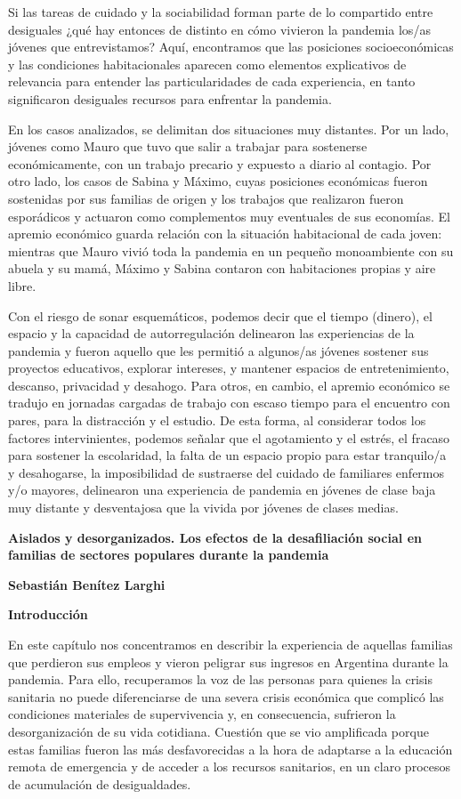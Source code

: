 Si las tareas de cuidado y la sociabilidad forman parte de lo compartido entre desiguales ¿qué hay entonces de distinto en cómo vivieron la pandemia los/as jóvenes que entrevistamos? Aquí, encontramos que las posiciones socioeconómicas y las condiciones habitacionales aparecen como elementos explicativos de relevancia para entender las particularidades de cada experiencia, en tanto significaron desiguales recursos para enfrentar la pandemia.

En los casos analizados, se delimitan dos situaciones muy distantes. Por un lado, jóvenes como Mauro que tuvo que salir a trabajar para sostenerse económicamente, con un trabajo precario y expuesto a diario al contagio. Por otro lado, los casos de Sabina y Máximo, cuyas posiciones económicas fueron sostenidas por sus familias de origen y los trabajos que realizaron fueron esporádicos y actuaron como complementos muy eventuales de sus economías. El apremio económico guarda relación con la situación habitacional de cada joven: mientras que Mauro vivió toda la pandemia en un pequeño monoambiente con su abuela y su mamá, Máximo y Sabina contaron con habitaciones propias y aire libre.

Con el riesgo de sonar esquemáticos, podemos decir que el tiempo (dinero), el espacio y la capacidad de autorregulación delinearon las experiencias de la pandemia y fueron aquello que les permitió a algunos/as jóvenes sostener sus proyectos educativos, explorar intereses, y mantener espacios de entretenimiento, descanso, privacidad y desahogo. Para otros, en cambio, el apremio económico se tradujo en jornadas cargadas de trabajo con escaso tiempo para el encuentro con pares, para la distracción y el estudio. De esta forma, al considerar todos los factores intervinientes, podemos señalar que el agotamiento y el estrés, el fracaso para sostener la escolaridad, la falta de un espacio propio para estar tranquilo/a y desahogarse, la imposibilidad de sustraerse del cuidado de familiares enfermos y/o mayores, delinearon una experiencia de pandemia en jóvenes de clase baja muy distante y desventajosa que la vivida por jóvenes de clases medias.

\textbf{Aislados y desorganizados. Los efectos de la desafiliación social en familias de sectores populares durante la pandemia}

\textbf{Sebastián Benítez Larghi}

\textbf{Introducción}

En este capítulo nos concentramos en describir la experiencia de aquellas familias que perdieron sus empleos y vieron peligrar sus ingresos en Argentina durante la pandemia. Para ello, recuperamos la voz de las personas para quienes la crisis sanitaria no puede diferenciarse de una severa crisis económica que complicó las condiciones materiales de supervivencia y, en consecuencia, sufrieron la desorganización de su vida cotidiana. Cuestión que se vio amplificada porque estas familias fueron las más desfavorecidas a la hora de adaptarse a la educación remota de emergencia y de acceder a los recursos sanitarios, en un claro procesos de acumulación de desigualdades.

